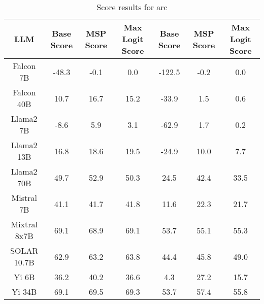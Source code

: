 \renewcommand\arraystretch{1.2}
\begin{table*}
\centering
\begin{tabular}{c|c|c|c|c|c|c}
LLM & Base Score & MSP Score & Max Logit Score & Base Score & MSP Score & Max Logit Score\\ \hline
Falcon 7B & -48.3 & -0.1 & 0.0 & -122.5 & -0.2 & 0.0\\
Falcon 40B & 10.7 & 16.7 & 15.2 & -33.9 & 1.5 & 0.6\\
Llama2 7B & -8.6 & 5.9 & 3.1 & -62.9 & 1.7 & 0.2\\
Llama2 13B & 16.8 & 18.6 & 19.5 & -24.9 & 10.0 & 7.7\\
Llama2 70B & 49.7 & 52.9 & 50.3 & 24.5 & 42.4 & 33.5\\
Mistral 7B & 41.1 & 41.7 & 41.8 & 11.6 & 22.3 & 21.7\\
Mixtral 8x7B & 69.1 & 68.9 & 69.1 & 53.7 & 55.1 & 55.3\\
SOLAR 10.7B & 62.9 & 63.2 & 63.8 & 44.4 & 45.8 & 49.0\\
Yi 6B & 36.2 & 40.2 & 36.6 & 4.3 & 27.2 & 15.7\\
Yi 34B & 69.1 & 69.5 & 69.3 & 53.7 & 57.4 & 55.8\\
\hline
\end{tabular}
\caption{Score results for arc}
\end{table*}
\label{tab:arc_score}
